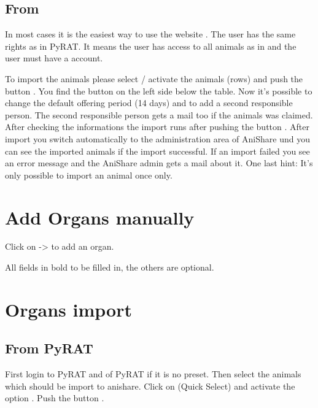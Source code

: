 \documentclass[letterpaper,10pt,openany,oneside,english]{sphinxmanual}
\begin{document}
\subsection{From }
\label{\detokenize{index:from-tick-lab}}
In most cases it is the easiest way to use the website . The user has the same rights as in PyRAT. It means the user has access to all animals
as in  and the user must have a  account.

\noindent{}

To import the animals please select / activate the animals (rows) and push the button . You find the button on the left
side below the table. Now it’s possible to change the default offering period (14 days) and to add a second responsible person.
The second responsible person gets a mail too if the animals was claimed. After checking the informations the import runs after pushing the button
. After import you switch automatically to the administration area of AniShare und you can see the imported animals
if the import successful. If an import failed you see an error message and the AniShare admin gets a mail about it. One last hint: It’s only possible to
import an animal once only.


\section{Add Organs manually}
\label{\detokenize{index:add-organs-manually}}
Click on  -\textgreater{}  to add an organ.

\noindent{}

All fields in bold  to be filled in, the others are optional.


\section{Organs import}
\label{\detokenize{index:organs-import}}

\subsection{From PyRAT}
\label{\detokenize{index:id1}}
First login to PyRAT and  of PyRAT if it is no preset. Then select the animals which
should be import to anishare. Click on  (Quick Select) and activate the option .
Push the button .
\end{document}
